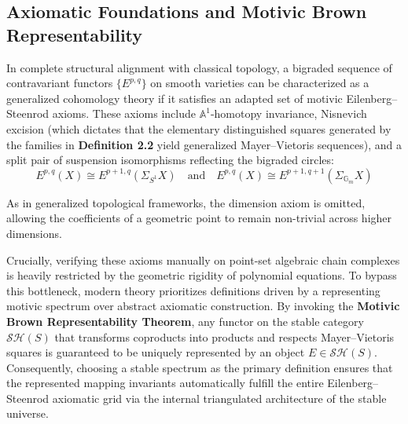 \documentclass[11pt,oneside]{article}
\begin{document}
\subsection{Axiomatic Foundations and Motivic Brown Representability}
In complete structural alignment with classical topology, a bigraded sequence of contravariant functors $\{E^{p,q}\}$ on smooth varieties can be characterized as a generalized cohomology theory if it satisfies an adapted set of motivic Eilenberg--Steenrod axioms. These axioms include $\mathbb{A}^1$-homotopy invariance, Nisnevich excision (which dictates that the elementary distinguished squares generated by the families in \textbf{Definition 2.2} yield generalized Mayer--Vietoris sequences), and a split pair of suspension isomorphisms reflecting the bigraded circles:
\[ E^{p,q}(X) \cong E^{p+1,q}(\Sigma_{S^1}X) \quad \text{and} \quad E^{p,q}(X) \cong E^{p+1,q+1}(\Sigma_{\mathbb{G}_m}X) \]

As in generalized topological frameworks, the dimension axiom is omitted, allowing the coefficients of a geometric point to remain non-trivial across higher dimensions.

Crucially, verifying these axioms manually on point-set algebraic chain complexes is heavily restricted by the geometric rigidity of polynomial equations. To bypass this bottleneck, modern theory prioritizes definitions driven by a representing motivic spectrum over abstract axiomatic construction. By invoking the \textbf{Motivic Brown Representability Theorem}, any functor on the stable category $\mathcal{SH}(S)$ that transforms coproducts into products and respects Mayer--Vietoris squares is guaranteed to be uniquely represented by an object $E \in \mathcal{SH}(S)$. Consequently, choosing a stable spectrum as the primary definition ensures that the represented mapping invariants automatically fulfill the entire Eilenberg--Steenrod axiomatic grid via the internal triangulated architecture of the stable universe.
  
\end{document}
